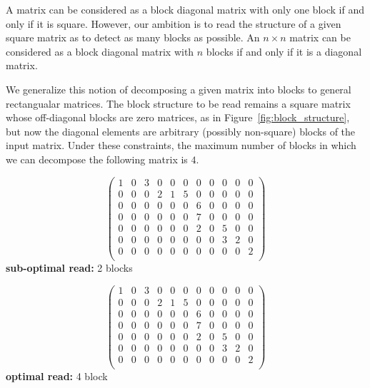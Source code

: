 A matrix can be considered as a block diagonal matrix with only one block if and only if it is square. However, our ambition is to read the structure of a given square matrix as to detect as many blocks as possible. An $n\times n$ matrix can be considered as a block diagonal matrix with $n$ blocks if and only if it is a diagonal matrix.

We generalize this notion of decomposing a given matrix into blocks to general rectangualar matrices.
The block structure to be read remains a square matrix whose off-diagonal blocks are zero matrices, as in Figure~\ref{fig:block_structure}, but now the diagonal elements are arbitrary (possibly non-square) blocks of the input matrix. Under these constraints, the maximum number of blocks in which we can decompose the following matrix is $4$.

\begin{table}[!h]
  \begin{minipage}{.5\textwidth}
    \centering
\[
\left(
\begin{array}{cccccc|ccccc}
    1 & 0 & 3  & 0 & 0 & 0   &  0 & 0 & 0 & 0  & 0     \\
    0 & 0 & 0  & 2 & 1 & 5   &  0 & 0 & 0 & 0  & 0     \\   \hline
    0 & 0 & 0  & 0 & 0 & 0   &  6 & 0 & 0 & 0  & 0     \\
    0 & 0 & 0  & 0 & 0 & 0   &  7 & 0 & 0 & 0  & 0     \\
    0 & 0 & 0  & 0 & 0 & 0   &  2 & 0 & 5 & 0  & 0     \\
    0 & 0 & 0  & 0 & 0 & 0   &  0 & 0 & 3 & 2  & 0     \\
    0 & 0 & 0  & 0 & 0 & 0   &  0 & 0 & 0 & 0  & 2     \\
\end{array}\right)
\]
    {\bf sub-optimal read:} 2 blocks
  \end{minipage}%
  \begin{minipage}{.5\textwidth}
    \centering
\[
\left(
\begin{array}{ccc|ccc|cccc|c}
    1 & 0 & 3  & 0 & 0 & 0   &  0 & 0 & 0 & 0  & 0     \\   \hline
    0 & 0 & 0  & 2 & 1 & 5   &  0 & 0 & 0 & 0  & 0     \\   \hline
    0 & 0 & 0  & 0 & 0 & 0   &  6 & 0 & 0 & 0  & 0     \\
    0 & 0 & 0  & 0 & 0 & 0   &  7 & 0 & 0 & 0  & 0     \\
    0 & 0 & 0  & 0 & 0 & 0   &  2 & 0 & 5 & 0  & 0     \\
    0 & 0 & 0  & 0 & 0 & 0   &  0 & 0 & 3 & 2  & 0     \\   \hline
    0 & 0 & 0  & 0 & 0 & 0   &  0 & 0 & 0 & 0  & 2     \\
\end{array}\right)
\]
    {\bf optimal read:} 4 block
    \end{minipage}
\end{table}

